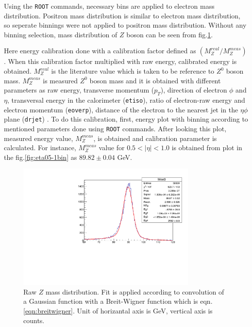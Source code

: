 Using the \texttt{ROOT} commands, necessary bins are applied to electron mass distribution. Positron mass distribution is similar to electron mass distribution, so seperate binnings were not applied to positron mass distribution. Without any binning selection, mass distribution of $Z$ boson can be seen from fig.\ref{fig:zfitraw}.

Here energy calibration done with a calibration factor defined as $\left(M_Z^{real} / M_Z^{meas}\right)$. When this calibration factor multiplied with raw energy, calibrated energy is obtained. $M_Z^{real}$ is the literature value which is taken to be reference to $Z^0$ boson mass. $M_Z^{meas}$ is measured $Z^0$ boson mass and it is obtained with different parameters as raw energy, transverse momentum ($p_T$), direction of electron $\phi$ and $\eta$, transversal energy in the calorimeter (\texttt{etiso}), ratio of electron-raw energy and electron momentum (\texttt{eoverp}), distance of the electron to the nearest jet in the $\eta\phi$ plane (\texttt{drjet}) \cite{atlaslabmanual}.
To do this calibration, first, energy plot with binning according to mentioned parameters done using \texttt{ROOT} commands. After looking this plot, measured energy value, $M_Z^{meas}$, is obtained and calibration parameter is calculated. For instance, $M_Z^{meas}$ value for $0.5<|\eta|<1.0$ is obtained from plot in the fig.\ref{fig:eta05-1bin} as $89.82 \pm 0.04$ GeV.

\begin{figure}[h]
    \centering
	\includegraphics[width=0.8\textwidth]{../figures/z_fit_raw.pdf}
	\caption{Raw $Z$ mass distribution. Fit is applied according to convolution of a Gaussian function with a Breit-Wigner function which is eqn.\ref{eqn:breitwigner}. Unit of horizantal axis is GeV, vertical axis is counts.}
    \label{fig:zfitraw}
\end{figure}
\FloatBarrier

